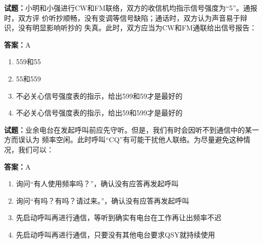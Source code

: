 \documentclass{ctexbook}
\begin{document}




\vspace{1em}

\textbf{试题：}小明和小强进行CW和FM联络，双方的收信机均指示信号强度为“5”。通报时，双方评
价听抄顺畅，没有变调等信号缺陷；通话时，双方认为声音易于辩识，没有明显影响听抄的
失真。此时，双方应当为CW和FM通联给出信号报告： 

\textbf{答案：}A 

\begin{enumerate}[leftmargin=3em]
  \item 559和55 

  \item 55和559 

  \item 不必关心信号强度表的指示，给出599和59才是最好的 

  \item 不必关心信号强度表的指示，给出59和599才是最好的 

\end{enumerate}





\vspace{1em}

\textbf{试题：}业余电台在发起呼叫前应先守听。但是，我们有时会因听不到通信中的某一方而误认为
频率空闲。此时呼叫“CQ”有可能干扰他人联络。为尽量避免这种情况，我们可以： 

\textbf{答案：}A 

\begin{enumerate}[leftmargin=3em]
  \item 询问“有人使用频率吗？”，确认没有应答再发起呼叫 

  \item 询问“有吗？有吗？请过来。”，确认没有应答再发起呼叫 

  \item 先启动呼叫再进行通信，等听到确实有电台在工作再让出频率不迟 

  \item 先启动呼叫再进行通信，只要没有其他电台要求QSY就持续使用 

\end{enumerate}



\end{document}
